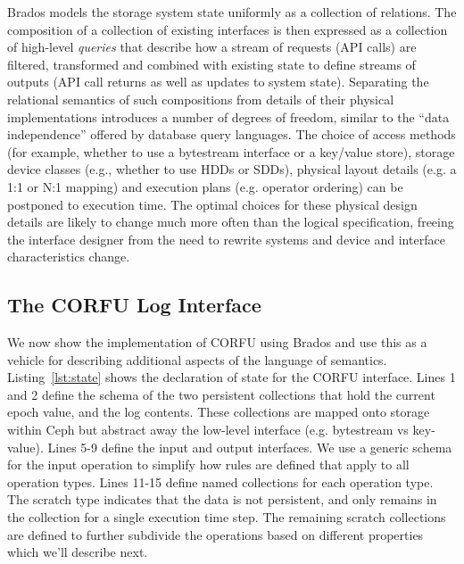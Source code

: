 \documentclass[10pt,twocolumn]{article}
\begin{document}
Brados models the storage system state uniformly as a collection of
relations. The composition of a collection of existing
interfaces is then expressed as a collection of high-level \emph{queries} that
describe how a stream of requests (API calls) are filtered, transformed and
combined with existing state to define streams of outputs (API call returns as
well as updates to system state).  Separating the relational semantics of such
compositions from details of their physical implementations introduces a
number of degrees of freedom, similar to the ``data independence'' offered by
database query languages.  The choice of access methods (for example, whether
to use a bytestream interface or a key/value store), storage device classes
(e.g., whether to use HDDs or SDDs), physical layout details (e.g. a 1:1 or
N:1 mapping) and execution plans (e.g. operator ordering) can be postponed to
execution time.  The optimal choices for these physical design details are
likely to change much more often than the logical specification, freeing the
interface designer from the need to rewrite systems and device and interface
characteristics change.

\subsection{The CORFU Log Interface}

We now show the implementation of CORFU using Brados and use this as a vehicle
for describing additional aspects of the language of semantics.
Listing~\ref{lst:state} shows the declaration of state for the CORFU
interface. Lines 1 and 2 define the schema of the two persistent collections
that hold the current epoch value, and the log contents. These collections are
mapped onto storage within Ceph but abstract away the low-level interface
(e.g. bytestream vs key-value). Lines 5-9 define the input and output
interfaces. We use a generic schema for the input operation to simplify
how rules are defined that apply to all operation types. Lines 11-15 define
named collections for each operation type. The scratch type indicates that the
data is not persistent, and only remains in the collection for a single 
execution time step. The remaining scratch collections are defined to further
subdivide the operations based on different properties which we'll describe next.
\end{document}
